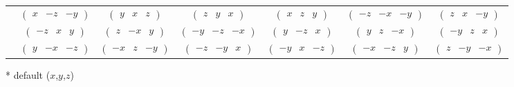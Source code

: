 \documentclass[fleqn,9pt,landscape]{jsarticle}
\begin{document}
\begin{center}
\begin{longtable}{ccccccc}
& $ \begin{pmatrix} x & - z & - y \end{pmatrix} $ & $ \begin{pmatrix} y & x & z \end{pmatrix} $ & $ \begin{pmatrix} z & y & x \end{pmatrix} $ & $ \begin{pmatrix} x & z & y \end{pmatrix} $ & $ \begin{pmatrix} - z & - x & - y \end{pmatrix} $ & $ \begin{pmatrix} z & x & - y \end{pmatrix} $ \\
& $ \begin{pmatrix} - z & x & y \end{pmatrix} $ & $ \begin{pmatrix} z & - x & y \end{pmatrix} $ & $ \begin{pmatrix} - y & - z & - x \end{pmatrix} $ & $ \begin{pmatrix} y & - z & x \end{pmatrix} $ & $ \begin{pmatrix} y & z & - x \end{pmatrix} $ & $ \begin{pmatrix} - y & z & x \end{pmatrix} $ \\
& $ \begin{pmatrix} y & - x & - z \end{pmatrix} $ & $ \begin{pmatrix} - x & z & - y \end{pmatrix} $ & $ \begin{pmatrix} - z & - y & x \end{pmatrix} $ & $ \begin{pmatrix} - y & x & - z \end{pmatrix} $ & $ \begin{pmatrix} - x & - z & y \end{pmatrix} $ & $ \begin{pmatrix} z & - y & - x \end{pmatrix} $ \\
\end{longtable}
\end{center}
* default ($x$,$y$,$z$)
\end{document}

